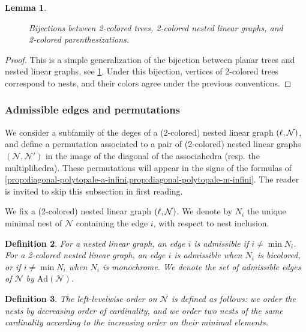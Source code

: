 \documentclass[twoside, 12pt]{amsart}
\newtheorem{definition}{Definition}[section]
\newtheorem{lemma}[definition]{Lemma}
\theoremstyle{remark}
\begin{document}
\begin{lemma}
\begin{figure}[h!]
{}
\caption{Bijections between 2-colored trees, 2-colored nested linear graphs, and 2-colored parenthesizations. }
\label{fig:bijections}
\end{figure}
\end{lemma}

\begin{proof}
This is a simple generalization of the bijection between planar trees and nested linear graphs, see \cref{fig:bijections}. 
Under this bijection, vertices of 2-colored trees correspond to nests, and their colors agree under the previous conventions. 
\end{proof}

\subsubsection{Admissible edges and permutations}
We consider a subfamily of the deges of a (2-colored) nested linear graph $(\ell,\mathcal{N})$, and define a permutation associated to a pair of (2-colored) nested linear graphs $(\mathcal{N},\mathcal{N}')$ in the image of the diagonal of the associahedra (resp. the multiplihedra). 
These permutations will appear in the signs of the formulas of \cref{prop:diagonal-polytopale-a-infini,prop:diagonal-polytopale-m-infini}.
The reader is invited to skip this subsection in first reading. 

We fix a (2-colored) nested linear graph $(\ell,\mathcal{N})$.
We denote by $N_i$ the unique minimal nest of $\mathcal{N}$ containing the edge $i$, with respect to nest inclusion. 

\begin{definition}
For a nested linear graph, an edge $i$ is \emph{admissible} if $i \neq \min N_i$. 
For a 2-colored nested linear graph, an edge $i$ is \emph{admissible} when $N_i$ is bicolored, or if $i \neq \min N_i$ when $N_i$ is monochrome.
We denote the set of admissible edges of $\mathcal{N}$ by $\mathrm{Ad}(\mathcal{N})$. 
\end{definition}

\begin{definition} 
\label{def:left-levelwise-graph}
The \emph{left-levelwise order} on $\mathcal{N}$ is defined as follows: we order the nests by decreasing order of cardinality, and we order two nests of the same cardinality according to the increasing order on their minimal elements. 
\end{definition}
\end{document}
